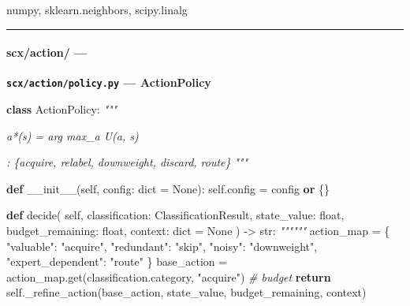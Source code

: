 \documentclass[
  12pt,
]{article}
\newenvironment{Shaded}{}{}
\newcommand{\BuiltInTok}[1]{\textcolor[rgb]{0.00,0.50,0.00}{#1}}
\newcommand{\CommentTok}[1]{\textcolor[rgb]{0.38,0.63,0.69}{\textit{#1}}}
\newcommand{\ControlFlowTok}[1]{\textcolor[rgb]{0.00,0.44,0.13}{\textbf{#1}}}
\newcommand{\FunctionTok}[1]{\textcolor[rgb]{0.02,0.16,0.49}{#1}}
\newcommand{\KeywordTok}[1]{\textcolor[rgb]{0.00,0.44,0.13}{\textbf{#1}}}
\newcommand{\NormalTok}[1]{#1}
\newcommand{\OperatorTok}[1]{\textcolor[rgb]{0.40,0.40,0.40}{#1}}
\newcommand{\StringTok}[1]{\textcolor[rgb]{0.25,0.44,0.63}{#1}}
\newcommand{\VariableTok}[1]{\textcolor[rgb]{0.10,0.09,0.49}{#1}}
\begin{document}
numpy, sklearn.neighbors, scipy.linalg

\begin{center}\rule{0.5\linewidth}{0.5pt}\end{center}

\paragraph{scx/action/ ---
}\label{scxaction-ux52a8ux4f5cux51b3ux7b56ux6a21ux5757}

\textbf{\texttt{scx/action/policy.py} --- ActionPolicy}



\begin{Shaded}
\begin{Highlighting}[]
\KeywordTok{class}\NormalTok{ ActionPolicy:}
    \CommentTok{"""}

\CommentTok{    }
\CommentTok{    a*(s) = arg max\_a U(a, s)}

\CommentTok{    : \{acquire, relabel, downweight, discard, route\}}
\CommentTok{    """}

    \KeywordTok{def} \FunctionTok{\_\_init\_\_}\NormalTok{(}\VariableTok{self}\NormalTok{, config: }\BuiltInTok{dict} \OperatorTok{=} \VariableTok{None}\NormalTok{):}
        \VariableTok{self}\NormalTok{.config }\OperatorTok{=}\NormalTok{ config }\KeywordTok{or}\NormalTok{ \{\}}

    \KeywordTok{def}\NormalTok{ decide(}
        \VariableTok{self}\NormalTok{,}
\NormalTok{        classification: ClassificationResult,}
\NormalTok{        state\_value: }\BuiltInTok{float}\NormalTok{,}
\NormalTok{        budget\_remaining: }\BuiltInTok{float}\NormalTok{,}
\NormalTok{        context: }\BuiltInTok{dict} \OperatorTok{=} \VariableTok{None}
\NormalTok{    ) }\OperatorTok{{-}\textgreater{}} \BuiltInTok{str}\NormalTok{:}
        \CommentTok{""""""}
\NormalTok{        action\_map }\OperatorTok{=}\NormalTok{ \{}
            \StringTok{"valuable"}\NormalTok{: }\StringTok{"acquire"}\NormalTok{,}
            \StringTok{"redundant"}\NormalTok{: }\StringTok{"skip"}\NormalTok{,}
            \StringTok{"noisy"}\NormalTok{: }\StringTok{"downweight"}\NormalTok{,}
            \StringTok{"expert\_dependent"}\NormalTok{: }\StringTok{"route"}
\NormalTok{        \}}
\NormalTok{        base\_action }\OperatorTok{=}\NormalTok{ action\_map.get(classification.category, }\StringTok{"acquire"}\NormalTok{)}
        \CommentTok{\#  budget }
        \ControlFlowTok{return} \VariableTok{self}\NormalTok{.\_refine\_action(base\_action, state\_value, budget\_remaining, context)}


\end{Highlighting}
\end{Shaded}
\end{document}
